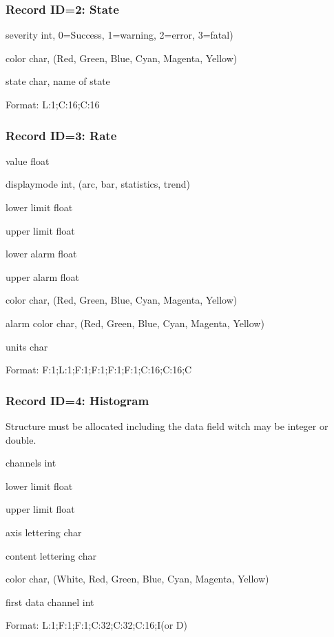 \subsubsection{Record ID=2: State}
\begin{compactdesc}
\item[severity] int, 0=Success, 1=warning, 2=error, 3=fatal)
\item[color] char, (Red, Green, Blue, Cyan, Magenta, Yellow)
\item[state] char, name of state
\item[Format:] L:1;C:16;C:16
\end{compactdesc}

\subsubsection{Record ID=3: Rate}
\begin{compactdesc}
\item[value]   float 
\item[displaymode ]   int, (arc, bar, statistics, trend)
\item[lower limit]   float 
\item[upper limit]   float 
\item[lower alarm]   float
\item[upper alarm]   float 
\item[color]   char,  (Red, Green, Blue, Cyan, Magenta, Yellow)
\item[alarm color]   char,  (Red, Green, Blue, Cyan, Magenta, Yellow)
\item[units]   char 
\item[Format:] F:1;L:1;F:1;F:1;F:1;F:1;C:16;C:16;C
\end{compactdesc}

\subsubsection{Record ID=4: Histogram}
Structure must be allocated including the data field witch may be integer or double.
\begin{compactdesc}
\item[channels]   int 
\item[lower limit]   float 
\item[upper limit]   float 
\item[axis lettering]   char 
\item[content lettering]   char 
\item[color]   char, (White, Red, Green, Blue, Cyan, Magenta, Yellow)
\item[first data channel]   int 
\item[Format:] L:1;F:1;F:1;C:32;C:32;C:16;I(or D)
\end{compactdesc}

